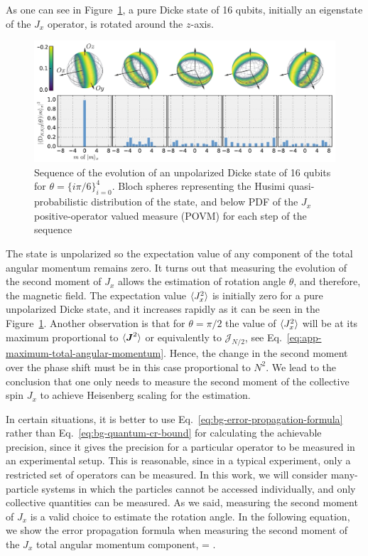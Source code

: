 As one can see in Figure~\ref{fig:vd-secuence-evo}, a pure Dicke state of 16 qubits, initially an eigenstate of the $J_x$ operator, is rotated around the $z$-axis.
\begin{figure}[htp]
  \centering
  \includegraphics[scale=.65]{img/plots/VD_evolution_of_dicke.pdf}
  \caption[Sequence of Dicke state evolution]{Sequence of the evolution of an unpolarized Dicke state of 16 qubits for $\theta=\{i\pi/6\}_{i=0}^4$. Bloch spheres representing the Husimi quasi-probabilistic distribution of the state, and below PDF of the $J_x$ positive-operator valued measure (POVM) for each step of the sequence}
  \label{fig:vd-secuence-evo}
\end{figure}
The state is unpolarized so the expectation value of any component of the total angular momentum remains zero.
It turns out that measuring the evolution of the second moment of $J_x$ allows the estimation of rotation angle $\theta$, and therefore, the magnetic field.
The expectation value $\langle{J_x^2}\rangle$ is initially zero for a pure unpolarized Dicke state, and it increases rapidly as it can be seen in the Figure~\ref{fig:vd-secuence-evo}.
Another observation is that for $\theta=\pi/2$ the value of $\langle{J_x^2}\rangle$ will be at its maximum proportional to $\langle{\ensuremath{\boldsymbol{J}}^2}\rangle$ or equivalently to $\mathcal{J}_{N/2}$, see Eq.~\eqref{eq:app-maximum-total-angular-momentum}.
Hence, the change in the second moment over the phase shift must be in this case proportional to $N^2$.
We lead to the conclusion that one only needs to measure the second moment of the collective spin $J_x$ to achieve Heisenberg scaling for the estimation.

In certain situations, it is better to use Eq.~\eqref{eq:bg-error-propagation-formula} rather than Eq.~\eqref{eq:bg-quantum-cr-bound} for calculating the achievable precision, since it gives the precision for a particular operator to be measured in an experimental setup.
This is reasonable, since in a typical experiment, only a restricted set of operators can be measured.
In this work, we will consider many-particle systems in which the particles cannot be accessed individually, and only collective quantities can be measured.
As we said, measuring the second moment of $J_x$ is a valid choice to estimate the rotation angle.
In the following equation, we show the error propagation formula when measuring the second moment of the $J_x$ total angular momentum component,
\be
  \varinv{\theta} = .
  \label{eq:vd-error-propagation}
\ee

